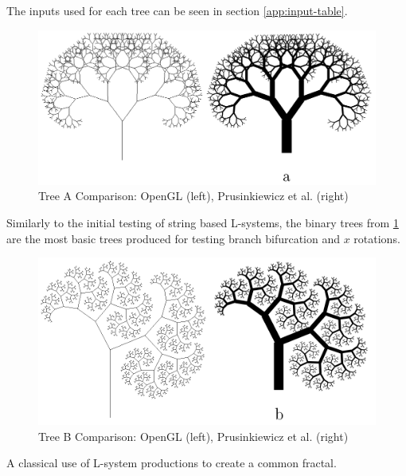 \documentclass[final]{cmpreport}
\begin{document}
The inputs used for each tree can be seen in section \ref{app:input-table}.

\begin{figure}[ht]
    \includegraphics[scale=0.4]{tree-comp-a.png} 
    \centering
    \captionsetup{justification=centering}
    \caption{Tree A Comparison: OpenGL (left), Prusinkiewicz et al. (right)}
    \label{fig:tree-comp-a}
\end{figure}

Similarly to the initial testing of string based L-systems, the binary trees from \ref{fig:tree-comp-a}  
are the most basic trees produced for testing branch bifurcation and $x$ rotations.

\begin{figure}[ht]
    \includegraphics[scale=0.4]{tree-comp-b.png} 
    \centering
    \captionsetup{justification=centering}
    \caption{Tree B Comparison: OpenGL (left), Prusinkiewicz et al. (right)}
    \label{fig:tree-comp-b}
\end{figure}

A classical use of L-system productions to create a common fractal. 
\end{document}
